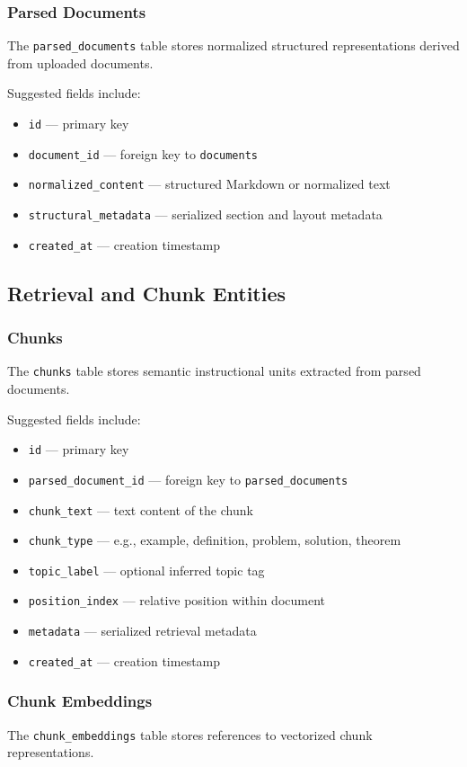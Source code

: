 \documentclass[11pt]{article}
\begin{document}
\subsubsection{Parsed Documents}
The \texttt{parsed\_documents} table stores normalized structured representations derived from uploaded documents.

Suggested fields include:
\begin{itemize}
\item \texttt{id} --- primary key
\item \texttt{document\_id} --- foreign key to \texttt{documents}
\item \texttt{normalized\_content} --- structured Markdown or normalized text
\item \texttt{structural\_metadata} --- serialized section and layout metadata
\item \texttt{created\_at} --- creation timestamp
\end{itemize}

\subsection{Retrieval and Chunk Entities}

\subsubsection{Chunks}
The \texttt{chunks} table stores semantic instructional units extracted from parsed documents.

Suggested fields include:
\begin{itemize}
\item \texttt{id} --- primary key
\item \texttt{parsed\_document\_id} --- foreign key to \texttt{parsed\_documents}
\item \texttt{chunk\_text} --- text content of the chunk
\item \texttt{chunk\_type} --- e.g., example, definition, problem, solution, theorem
\item \texttt{topic\_label} --- optional inferred topic tag
\item \texttt{position\_index} --- relative position within document
\item \texttt{metadata} --- serialized retrieval metadata
\item \texttt{created\_at} --- creation timestamp
\end{itemize}

\subsubsection{Chunk Embeddings}
The \texttt{chunk\_embeddings} table stores references to vectorized chunk representations.
\end{document}
